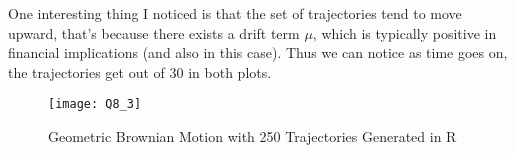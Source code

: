 \documentclass[letterpaper]{article}
\begin{document}
One interesting thing I noticed is that the set of trajectories tend to move upward, that's because there exists a drift term $\mu$, which is typically positive in financial implications (and also in this case). Thus we can notice as time goes on, the trajectories get out of 30 in both plots.

  \begin{figure}
 	\caption{Geometric Brownian Motion with 250 Trajectories Generated in R}
 	\centering
 	\texttt{[image: Q8\_3]}
 \end{figure}
	 
	 
	
\end{document}
